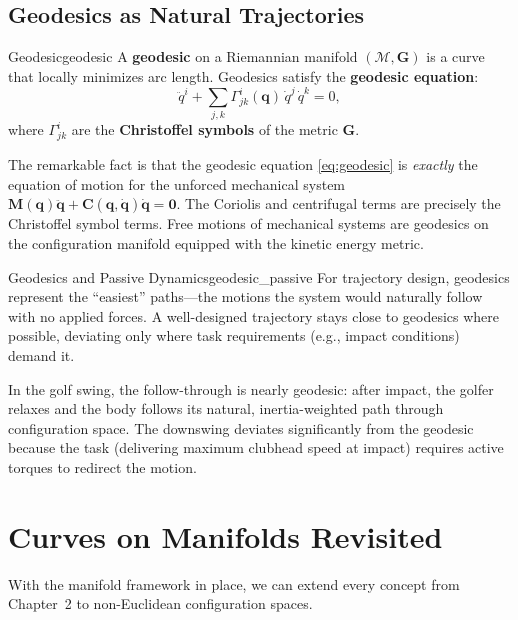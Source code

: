 \documentclass[12pt, openany]{book}
\theoremstyle{plain}
\newcommand{\manifold}{\mathcal{M}}
\begin{document}
\subsection{Geodesics as Natural Trajectories}

\begin{definition}{Geodesic}{geodesic}
  A \textbf{geodesic} on a Riemannian manifold $(\manifold, \bm{G})$ is a
  curve that locally minimizes arc length. Geodesics satisfy the
  \textbf{geodesic equation}:
  \begin{equation}\label{eq:geodesic}
    \ddot{q}^i + \sum_{j,k} \Gamma^i_{jk}(\bm{q})\, \dot{q}^j\, \dot{q}^k = 0,
  \end{equation}
  where $\Gamma^i_{jk}$ are the \textbf{Christoffel symbols} of the metric
  $\bm{G}$.
\end{definition}

The remarkable fact is that the geodesic equation \eqref{eq:geodesic} is
\emph{exactly} the equation of motion for the unforced mechanical system
$\bm{M}(\bm{q})\ddot{\bm{q}} + \bm{C}(\bm{q}, \dot{\bm{q}})\dot{\bm{q}} = \bm{0}$.
The Coriolis and centrifugal terms are precisely the Christoffel symbol terms.
Free motions of mechanical systems are geodesics on the configuration manifold
equipped with the kinetic energy metric.

\begin{principle}{Geodesics and Passive Dynamics}{geodesic_passive}
  For trajectory design, geodesics represent the ``easiest'' paths---the
  motions the system would naturally follow with no applied forces. A
  well-designed trajectory stays close to geodesics where possible,
  deviating only where task requirements (e.g., impact conditions) demand
  it.

  In the golf swing, the follow-through is nearly geodesic: after impact,
  the golfer relaxes and the body follows its natural, inertia-weighted
  path through configuration space. The downswing deviates significantly
  from the geodesic because the task (delivering maximum clubhead speed at
  impact) requires active torques to redirect the motion.
\end{principle}

\section{Curves on Manifolds Revisited}

With the manifold framework in place, we can extend every concept from
Chapter~2 to non-Euclidean configuration spaces.
\end{document}
